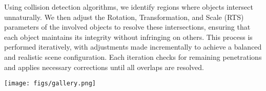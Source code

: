 Using collision detection algorithms, we identify regions where objects intersect unnaturally. We then adjust the Rotation, Transformation, and Scale (RTS) parameters of the involved objects to resolve these intersections, ensuring that each object maintains its integrity without infringing on others. This process is performed iteratively, with adjustments made incrementally to achieve a balanced and realistic scene configuration. Each iteration checks for remaining penetrations and applies necessary corrections until all overlaps are resolved.


\begin{figure*} [h]
  \centering
  \texttt{[image: figs/gallery.png]}
   \label{fig_gallery}
\end{figure*}

